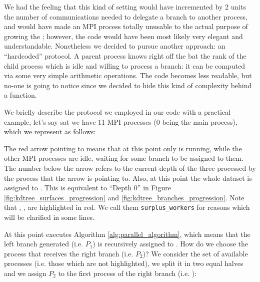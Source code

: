 \documentclass{article}
\begin{document}
We had the feeling that this kind of setting would have incremented by 2 units
the number of communications needed to delegate a branch to another process, and
would have made an MPI process totally unusable to the actual purpose of growing
the \kdtree{}; however, the code would have been most likely very elegant and
understandable. Nonetheless we decided to pursue another approach: an
``hardcoded'' protocol. A parent process knows right off the bat the rank
of the child process which is idle and willing to process a branch:
it can be computed via some very simple arithmetic operations. The code
becomes less readable, but no-one is going to notice since we decided to hide
this kind of complexity behind a function.

We briefly describe the protocol we employed in our code with a practical
example, let's say sat we have 11 MPI processes (0 being the main process),
which we represent as follows:

\begin{figure}[H]
    \centering
\end{figure}

The red arrow pointing to  means that at this point only  is
running, while the other MPI processes are idle, waiting for some branch to be
assigned to them. The number below the arrow refers to the current depth of the
three processed by the process that the arrow is pointing to. Also, at this
point the whole dataset is assigned to . This is equivalent to
``Depth 0'' in Figure \ref{fig:kdtree_surfaces_progression} and
\ref{fig:kdtree_branches_progression}. Note that , , 
are highlighted in red. We call them \texttt{surplus\_workers} for reasons which
will be clarified in some lines.

At this point  executes Algorithm \ref{alg:parallel_algorithm},
which means that the left branch generated (i.e. $P_1$) is recursively assigned
to . How do we choose the process that receives the right branch (i.e.
$P_2$)? We consider the set of available processes (i.e. those which are not
highlighted), we split it in two equal halves and we assign $P_2$ to the first
process of the right branch (i.e. ):
\end{document}
